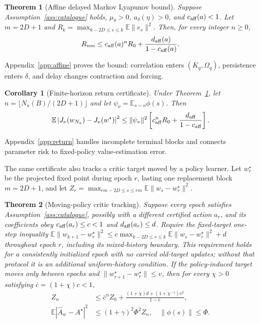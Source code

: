 \documentclass[journal]{IEEEtran}
\newtheorem{theorem}{Theorem}
\newtheorem{corollary}{Corollary}
\newcommand{\E}{\mathbb{E}}
\begin{document}
\begin{theorem}[Affine delayed Markov Lyapunov bound]
Suppose Assumption~\ref{ass:catalogue} holds, $\mu_\delta>0$, $a_\delta(\eta)>0$, and $c_{\rm aff}(a)<1$.
Let $m=2D+1$ and $R_k=\max_{k-2D\le s\le k}\E\|e_s\|^2$.
Then, for every integer $n\ge0$,
\begin{equation}
R_{nm}\le c_{\rm aff}(a)^nR_0+\frac{d_{\rm aff}(a)}{1-c_{\rm aff}(a)}.
\label{eq:affine-bound}
\end{equation}
\label{thm:affine}
\end{theorem}
Appendix~\ref{app:affine} proves the bound: correlation enters $(K_q,\Omega_q)$, persistence enters $\delta$, and delay changes contraction and forcing.

\begin{corollary}[Finite-horizon return certificate]
Under Theorem~\ref{thm:affine}, let $n=\lfloor N_a(B)/(2D+1)\rfloor$ and let $\psi_\nu=\E_{s\sim\nu}\phi(s)$.
Then
\begin{equation}
\E\left|J_\nu(w_{N_a})-J_\nu(w^\star)\right|^2
\le \|\psi_\nu\|^2
\left[c_{\rm aff}^{n}R_0+\frac{d_{\rm aff}}{1-c_{\rm aff}}\right].
\label{eq:return-certificate}
\end{equation}
\label{cor:return}
\end{corollary}

Appendix~\ref{app:return} handles incomplete terminal blocks and connects parameter risk to fixed-policy value-estimation error.

The same certificate also tracks a critic target moved by a policy learner.
Let $w_r^\star$ be the projected fixed point during epoch $r$, lasting one replacement block $m=2D+1$, and let $Z_r=\max_{rm-2D\le s\le rm}\E\|w_s-w_r^\star\|^2$.

\begin{theorem}[Moving-policy critic tracking]
Suppose every epoch satisfies Assumption~\ref{ass:catalogue}, possibly with a different certified action $a_r$, and its coefficients obey $c_{\rm aff}(a_r)\le c<1$ and $d_{\rm aff}(a_r)\le d$.
Require the fixed-target one-step inequality $\E\|w_{k+1}-w_r^\star\|^2\le c\max_{k-2D\le s\le k}\E\|w_s-w_r^\star\|^2+d$ throughout epoch $r$, including its mixed-history boundary.
This requirement holds for a consistently initialized epoch with no carried old-target updates; without that protocol it is an additional uniform-history condition.
If the policy-induced target moves only between epochs and
$\|w_{r+1}^\star-w_r^\star\|\le v$, then for every $\chi>0$ satisfying $\bar c=(1+\chi)c<1$,
\begin{align}
Z_n&\le \bar c^n Z_0+
\frac{(1+\chi)d+(1+\chi^{-1})v^2}{1-\bar c},\label{eq:tracking-bound}\\
\E|\widehat A_w-A^\star|^2
&\le (1+\gamma)^2\Phi^2 Z_n,\quad \|\phi(s)\|\le\Phi.
\label{eq:advantage-transfer}
\end{align}
\label{thm:tracking}
\end{theorem}
\end{document}
